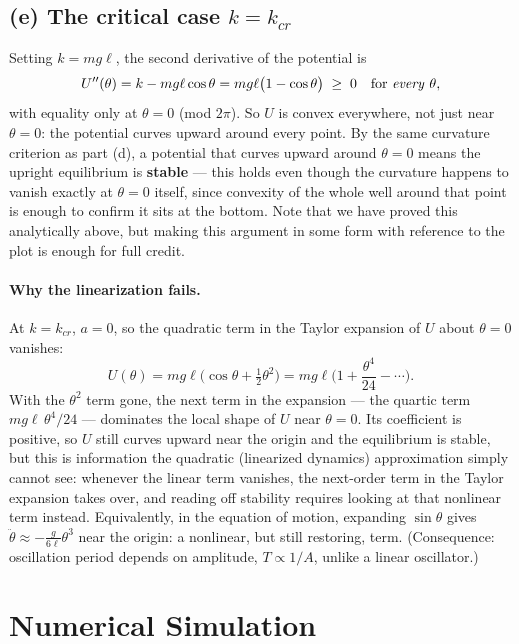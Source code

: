 \documentclass[11pt]{article}
\newcommand{\kcr}{k_{cr}}
\newcommand{\thdd}{\ddot\theta}
\begin{document}
\subsection*{(e) The critical case $k=\kcr$}
Setting $k=mg\ell$, the second derivative of the potential is
\[
  U''(\theta) = k - mg\ell\cos\theta = mg\ell\big(1-\cos\theta\big) \;\ge\; 0 \quad\text{for \emph{every} }\theta,
\]
with equality only at $\theta=0$ (mod $2\pi$). So $U$ is convex everywhere, not just near $\theta=0$: the potential curves upward around every point. By the same curvature criterion as part (d), a potential that curves upward around $\theta=0$ means the upright equilibrium is \textbf{stable} --- this holds even though the curvature happens to vanish exactly at $\theta=0$ itself, since convexity of the whole well around that point is enough to confirm it sits at the bottom. Note that we have proved this analytically above, but making this argument in some form with reference to the plot is enough for full credit.

\paragraph{Why the linearization fails.}
At $k=\kcr$, $a=0$, so the quadratic term in the Taylor expansion of $U$ about $\theta=0$ vanishes:
\[
  U(\theta) = mg\ell\Big(\cos\theta+\tfrac12\theta^2\Big) = mg\ell\Big(1 + \frac{\theta^4}{24} - \cdots\Big).
\]
With the $\theta^2$ term gone, the next term in the expansion --- the quartic term $mg\ell\,\theta^4/24$ --- dominates the local shape of $U$ near $\theta=0$. Its coefficient is positive, so $U$ still curves upward near the origin and the equilibrium is stable, but this is information the quadratic (linearized dynamics) approximation simply cannot see: whenever the linear term vanishes, the next-order term in the Taylor expansion takes over, and reading off stability requires looking at that nonlinear term instead. Equivalently, in the equation of motion, expanding $\sin\theta$ gives $\thdd \approx -\frac{g}{6\ell}\theta^3$ near the origin: a nonlinear, but still restoring, term. (Consequence: oscillation period depends on amplitude, $T\propto 1/A$, unlike a linear oscillator.)

\section{Numerical Simulation}
\end{document}
